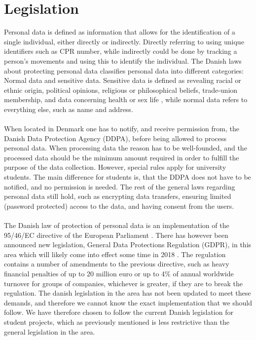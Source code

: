 
\section{Legislation}
\label{sec:legislation}

Personal data is defined as information that allows for the identification of a single individual, either directly or indirectly. Directly referring to using unique identifiers such as CPR number, while indirectly could be done by tracking a person's movements and using this to identify the individual. The Danish laws about protecting personal data classifies personal data into different categories: Normal data and sensitive data. Sensitive data is defined as revealing racial or ethnic origin, political opinions, religious or philosophical beliefs, trade-union membership, and data concerning health or sex life \parencite{datatilsynet_stud1}, while normal data refers to everything else, such as name and address.  
\\\\
When located in Denmark one has to notify, and receive permission from, the Danish Data Protection Agency (DDPA), before being allowed to process personal data. When processing data the reason has to be well-founded, and the processed data should be the minimum amount required in order to fulfill the purpose of the data collection. However, special rules apply for university students. The main difference for students is, that the DDPA does not have to be notified, and no permission is needed. The rest of the general laws regarding personal data still hold, such as encrypting data transfers, ensuring limited (password protected) access to the data, and having consent from the users. 
\\\\
The Danish law of protection of personal data is an implementation of the 95/46/EC directive of the European Parliament \parencite{eu_personal_data_law}. There has however been announced new legislation, General Data Protections Regulation (GDPR), in this area which will likely come into effect some time in 2018 \parencite{eu_data_law_changing}. The regulation contains a number of amendments to the previous directive, such as heavy financial penalties of up to 20 million euro or up to 4\% of annual worldwide turnover for groups of companies, whichever is greater, if they are to break the regulation. The danish legislation in the area has not been updated to meet these demands, 
and therefore we cannot know the exact implementation that we should follow. We have therefore chosen to follow the current Danish legislation for student projects, which as previously mentioned is less restrictive than the general legislation in the area. 

